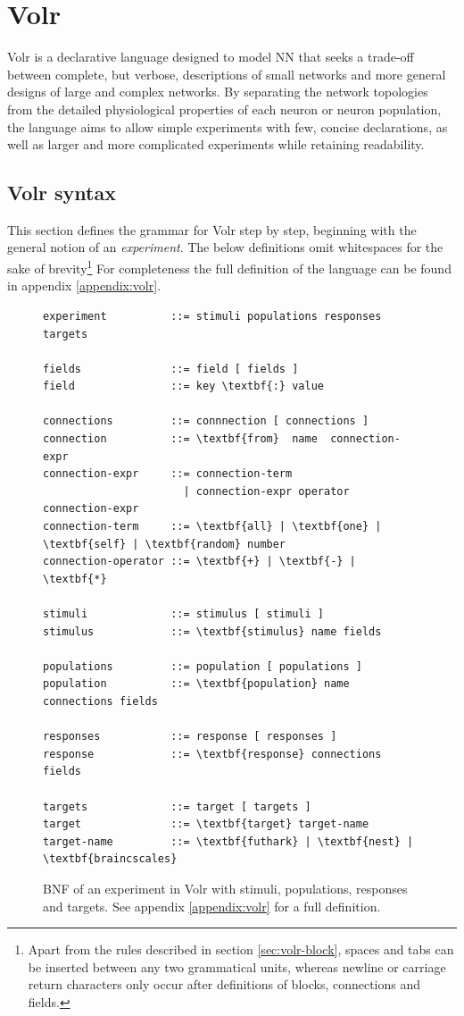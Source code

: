 \section{Volr}
Volr is a declarative language designed to model \gls{NN} that seeks a
trade-off between complete, but verbose, descriptions of small
networks and more general designs of large and complex networks.
By separating the network topologies from the detailed physiological properties
of each neuron or neuron population, the language aims to allow simple
experiments with few, concise declarations, as well as larger and more
complicated experiments while retaining readability.

\subsection{Volr syntax}
This section defines the grammar for Volr step by step, beginning
with the general notion of an \textit{experiment}.
The below definitions omit whitespaces for the sake of brevity\footnote{
Apart from the rules described in section \ref{sec:volr-block}, spaces and
tabs can be inserted between any two grammatical units, whereas newline
or carriage return characters only occur after definitions of blocks,
connections and fields.
}
For completeness the full definition of the language can be found in appendix
\ref{appendix:volr}.

\renewcommand{\syntleft}{}
\renewcommand{\syntright}{}

\begin{figure}
  \begin{Verbatim}[commandchars=\\\{\}]
experiment          ::= stimuli populations responses targets

fields              ::= field [ fields ]
field               ::= key \textbf{:} value

connections         ::= connnection [ connections ]
connection          ::= \textbf{from}  name  connection-expr
connection-expr     ::= connection-term
                      | connection-expr operator connection-expr
connection-term     ::= \textbf{all} | \textbf{one} | \textbf{self} | \textbf{random} number
connection-operator ::= \textbf{+} | \textbf{-} | \textbf{*}

stimuli             ::= stimulus [ stimuli ]
stimulus            ::= \textbf{stimulus} name fields

populations         ::= population [ populations ]
population          ::= \textbf{population} name connections fields

responses           ::= response [ responses ]
response            ::= \textbf{response} connections fields

targets             ::= target [ targets ]
target              ::= \textbf{target} target-name
target-name         ::= \textbf{futhark} | \textbf{nest} | \textbf{braincscales}

  \end{Verbatim}
  \caption{BNF of an experiment in Volr with stimuli, populations, responses and
           targets. See appendix \ref{appendix:volr} for a full definition.}
  \label{fig:volr-bnf}
\end{figure}

